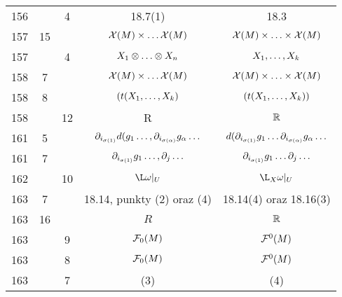 \documentclass[a4paper,11pt]{article}
\begin{document}
\begin{center}
\begin{tabular}{|c|c|c|c|c|}
    156 & &  4 & 18.7(1) & 18.3 \\
    157 & 15 & & $\mathcal{X}( M ) \times \ldots \mathcal{X}( M )$
           & $\mathcal{X}( M ) \times \ldots \times \mathcal{X}( M )$ \\
    157 & &  4 & $X_{ 1 } \otimes \ldots \otimes X_{ n }$ & $X_{ 1 }, \ldots, X_{ k }$ \\
    158 &  7 & & $\mathcal{X}( M ) \times \ldots \mathcal{X}( M )$
           & $\mathcal{X}( M ) \times \ldots \times \mathcal{X}( M )$ \\
    158 &  8 & & $( t( X_{ 1 }, \ldots, X_{ k } )$
           & $( t( X_{ 1 }, \ldots, X_{ k } ) )$ \\
    158 & & 12 & R & $\mathbb{R}$ \\
    161 &  5 & & $\partial_{ i_{ \sigma( 1 ) } } d( g_{ 1 } \ldots, \partial_{ i_{ \sigma( \alpha ) } } g_{ \alpha } \ldots$
           & $d( \partial_{ i_{ \sigma( 1 ) } } g_{ 1 } \ldots \partial_{ i_{ \sigma( \alpha ) } } g_{ \alpha } \ldots$ \\
    161 &  7 & & $\partial_{ i_{ \sigma( 1 ) } } g_{ 1 } \ldots, \partial_{ j }\ldots$
           & $\partial_{ i_{ \sigma( 1 ) } } g_{ 1 } \ldots \partial_{ j }\ldots$ \\
    162 & & 10 & $\L\om |_{ U }$ & $\L_{ X }\om|_{ U } $ \\
    163 &  7 & & 18.14, punkty (2) oraz (4) & 18.14(4) oraz 18.16(3) \\
    163 & 16 & & $R$ & $\mathbb{R}$ \\
    163 & &  9 & $\mathcal{F}_{ 0 }( M )$ & $\mathcal{F}^{ 0 }( M )$ \\
    163 & &  8 & $\mathcal{F}_{ 0 }( M )$ & $\mathcal{F}^{ 0 }( M )$ \\
    163 & &  7 & (3) & (4) \\
    \hline
  \end{tabular}



\end{center}
\end{document}

